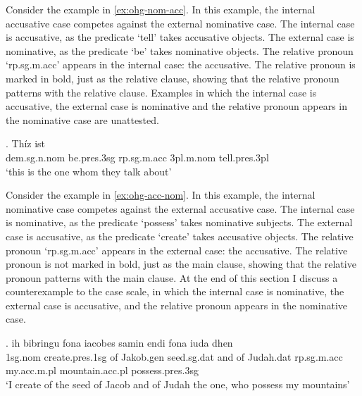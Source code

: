 Consider the example in \ref{ex:ohg-nom-acc}. In this example, the internal accusative case competes against the external nominative case.
The internal case is accusative, as the predicate  `tell' takes accusative objects.
The external case is nominative, as the predicate  `be' takes nominative objects.
The relative pronoun  `\ac{rp}.\ac{sg}.\ac{m}.\ac{acc}' appears in the internal case: the accusative. The relative pronoun is marked in bold, just as the relative clause, showing that the relative pronoun patterns with the relative clause.
Examples in which the internal case is accusative, the external case is nominative and the relative pronoun appears in the nominative case are unattested.

\exg. Thíz ist   \\
\ac{dem}.\ac{sg}.\ac{n}.\ac{nom} be.\ac{pres}.3\ac{sg}\scsub{[nom]} \ac{rp}.\ac{sg}.\ac{m}.\ac{acc} 3\ac{pl}.\ac{m}.\ac{nom} tell.\ac{pres}.3\ac{pl}\scsub{[acc]}\\
`this is the one whom they talk about' \label{ex:ohg-nom-acc}

Consider the example in \ref{ex:ohg-acc-nom}. In this example, the internal nominative case competes against the external accusative case.
The internal case is nominative, as the predicate  `possess' takes nominative subjects.
The external case is accusative, as the predicate  `create' takes accusative objects.
The relative pronoun  `\ac{rp}.\ac{sg}.\ac{m}.\ac{acc}' appears in the external case: the accusative. The relative pronoun is not marked in bold, just as the main clause, showing that the relative pronoun patterns with the main clause.
At the end of this section I discuss a counterexample to the case scale, in which the internal case is nominative, the external case is accusative, and the relative pronoun appears in the nominative case.

\exg. ih bibringu fona iacobes samin endi fona iuda dhen   \\
1\ac{sg}.\ac{nom} {create}.\ac{pres}.1\ac{sg}\scsub{[acc]} of Jakob.\ac{gen} seed.\ac{sg}.\ac{dat} and of Judah.\ac{dat} \ac{rp}.\ac{sg}.\ac{m}.\ac{acc} my.\ac{acc}.\ac{m}.\ac{pl} mountain.\ac{acc}.\ac{pl} possess.\ac{pres}.3\ac{sg}\scsub{[nom]}\\
`I create of the seed of Jacob and of Judah the one, who possess my mountains' \label{ex:ohg-acc-nom}

